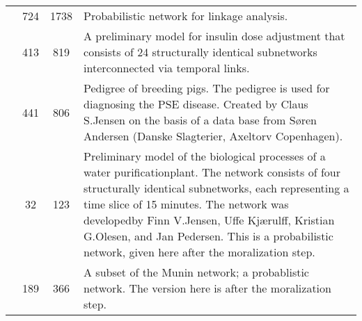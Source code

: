 \documentclass[thesis.tex]{subfiles}
\begin{document}
\begin{table}[tbp]
\begin{tabularx}{\textwidth}{p{5em}S[table-format=4]S[table-format=4]>{\raggedright\arraybackslash}X}
       & 724 & 1738 &
      Probabilistic network for linkage analysis.\\[\RowSeparatorLength]

       & 413 & 819 &
      A preliminary model for insulin dose adjustment that consists of 24 structurally identical subnetworks interconnected via temporal links.~\parencite{DiabetesInstances}
      \\[\RowSeparatorLength]

       & 441 & 806 &
      Pedigree of breeding pigs. The pedigree is used for diagnosing the PSE disease. Created by Claus S.\@ Jensen on the basis of a data base from Søren Andersen (Danske Slagterier, Axeltorv Copenhagen).
      \\[\RowSeparatorLength]

       & 32 & 123 &
      Preliminary model of the biological processes of a water purificationplant. The network consists of four structurally identical subnetworks, each representing a time slice of 15 minutes. The network was developedby Finn V.\@ Jensen, Uffe Kjærulff, Kristian G.\@ Olesen, and Jan Pedersen. This is a probabilistic network, given here after the moralization step.
      \\[\RowSeparatorLength]

       & 189 & 366 &
      A subset of the Munin network; a probablistic network. The version here is after the moralization step.\\
   \bottomrule
   \end{tabularx}
\end{table}
\end{document}
